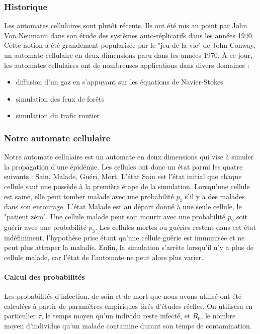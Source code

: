 \documentclass{article}
\begin{document}
\subsubsection{Historique}
	Les automates cellulaires sont plutôt récents. Ils ont été mis au point par John Von Neumann dans son étude des systèmes auto-réplicatifs dans les années 1940. Cette notion a été grandement popularisée par le "jeu de la vie" de John Conway, un automate cellulaire en deux dimensions paru dans les années 1970. À ce jour, les automates cellulaires ont de nombreuses applications dans divers domaines :
	\begin{itemize}
	\item diffusion d'un gaz en s'appuyant sur les équations de Navier-Stokes
	\item simulation des feux de forêts
	\item simulation du trafic routier
	\end{itemize}

\subsubsection{Notre automate cellulaire}
	Notre automate cellulaire est un automate en deux dimensions qui vise à simuler la propagation d'une épidémie. Les cellules ont donc un état parmi les quatre suivants : Sain, Malade, Guéri, Mort. L'état Sain est l'état initial que chaque cellule sauf une possède à la première étape de la simulation. Lorsqu'une cellule est saine, elle peut tomber malade avec une probabilité $p_1$ s'il y a des malades dans son entourage. L'état Malade est au départ donné à une seule cellule, le "patient zéro". Une cellule malade peut soit mourir avec une probabilité $p_2$ soit guérir avec une probabilité $p_3$. Les cellules mortes ou guéries restent dans cet état indéfiniment, l'hypothèse prise étant qu'une cellule guérie est immunisée et ne peut plus attraper la maladie. Enfin, la simulation s'arrête lorsqu'il n'y a plus de cellule malade, car l'état de l'automate ne peut alors plus varier.
	
\paragraph{Calcul des probabilités\\}
	Les probabilités d'infection, de soin et de mort que nous avons utilisé ont été calculées à partir de paramètres empiriques tirés d'études réelles. On utilisera en particulier $\tau$, le temps moyen qu'un individu reste infecté, et $R_0$, le nombre moyen d'individus qu'un malade contamine durant son temps de contamination.
	
\end{document}
